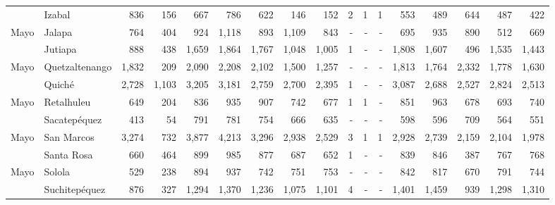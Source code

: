 \begin{landscape}
\begin{center}
\begin{longtable}{llrrrrrrrrrrrrrrr}
\rowcolor{color1!5!white}\multicolumn{1}{l}{	\footnotesize	 Mayo 	}&	 Izabal 	&	 836 	&	 156 	&	 667 	&	 786 	&	 622 	&	 146 	&	 152 	&	 2 	&	 1 	&	 1 	&	 553 	&	 489 	&	 644 	&	 487 	&	 422 	\\
\multicolumn{1}{l}{	\footnotesize	 Mayo 	}&	 Jalapa 	&	 764 	&	 404 	&	 924 	&	 1,118 	&	 893 	&	 1,109 	&	 843 	&	 -   	&	 -   	&	 -   	&	 695 	&	 935 	&	 890 	&	 512 	&	 669 	\\
\rowcolor{color1!5!white}\multicolumn{1}{l}{	\footnotesize	 Mayo 	}&	 Jutiapa 	&	 888 	&	 438 	&	 1,659 	&	 1,864 	&	 1,767 	&	 1,048 	&	 1,005 	&	 1 	&	 -   	&	 -   	&	 1,808 	&	 1,607 	&	 496 	&	 1,535 	&	 1,443 	\\
\multicolumn{1}{l}{	\footnotesize	 Mayo 	}&	 Quetzaltenango 	&	 1,832 	&	 209 	&	 2,090 	&	 2,208 	&	 2,102 	&	 1,500 	&	 1,257 	&	 -   	&	 -   	&	 -   	&	 1,813 	&	 1,764 	&	 2,332 	&	 1,778 	&	 1,630 	\\
\rowcolor{color1!5!white}\multicolumn{1}{l}{	\footnotesize	 Mayo 	}&	 Quiché 	&	 2,728 	&	 1,103 	&	 3,205 	&	 3,181 	&	 2,759 	&	 2,700 	&	 2,395 	&	 1 	&	 -   	&	 -   	&	 3,087 	&	 2,688 	&	 2,527 	&	 2,824 	&	 2,513 	\\
\multicolumn{1}{l}{	\footnotesize	 Mayo 	}&	 Retalhuleu 	&	 649 	&	 204 	&	 836 	&	 935 	&	 907 	&	 742 	&	 677 	&	 1 	&	 1 	&	 -   	&	 851 	&	 963 	&	 678 	&	 693 	&	 740 	\\
\rowcolor{color1!5!white}\multicolumn{1}{l}{	\footnotesize	 Mayo 	}&	 Sacatepéquez 	&	 413 	&	 54 	&	 791 	&	 781 	&	 754 	&	 666 	&	 635 	&	 -   	&	 -   	&	 -   	&	 598 	&	 596 	&	 709 	&	 564 	&	 551 	\\
\multicolumn{1}{l}{	\footnotesize	 Mayo 	}&	 San Marcos 	&	 3,274 	&	 732 	&	 3,877 	&	 4,213 	&	 3,296 	&	 2,938 	&	 2,529 	&	 3 	&	 1 	&	 1 	&	 2,928 	&	 2,739 	&	 2,159 	&	 2,104 	&	 1,978 	\\
\rowcolor{color1!5!white}\multicolumn{1}{l}{	\footnotesize	 Mayo 	}&	 Santa Rosa 	&	 660 	&	 464 	&	 899 	&	 985 	&	 877 	&	 687 	&	 652 	&	 1 	&	 -   	&	 -   	&	 839 	&	 846 	&	 387 	&	 767 	&	 768 	\\
\multicolumn{1}{l}{	\footnotesize	 Mayo 	}&	 Solola 	&	 529 	&	 238 	&	 894 	&	 937 	&	 742 	&	 751 	&	 753 	&	 -   	&	 -   	&	 -   	&	 842 	&	 817 	&	 670 	&	 791 	&	 744 	\\
\rowcolor{color1!5!white}\multicolumn{1}{l}{	\footnotesize	 Mayo 	}&	 Suchitepéquez 	&	 876 	&	 327 	&	 1,294 	&	 1,370 	&	 1,236 	&	 1,075 	&	 1,101 	&	 4 	&	 -   	&	 -   	&	 1,401 	&	 1,459 	&	 939 	&	 1,298 	&	 1,310 	\\

\end{longtable}
\end{center}
\end{landscape}
